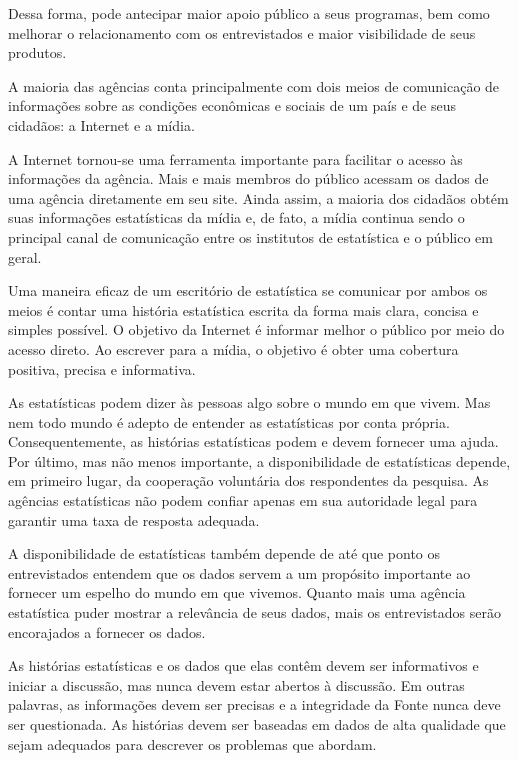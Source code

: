 Dessa forma, pode antecipar maior apoio público a seus programas, bem como melhorar o relacionamento com os entrevistados e maior visibilidade de seus produtos.\vskip0.3cm 

A maioria das agências conta principalmente com dois meios de comunicação de informações sobre as condições econômicas e sociais de um país e de seus cidadãos: a Internet e a mídia.\vskip0.3cm 

A Internet tornou-se uma ferramenta importante para facilitar o acesso às informações da agência. Mais e mais membros do público acessam os dados de uma agência diretamente em seu site. Ainda assim, a maioria dos cidadãos obtém suas informações estatísticas da mídia e, de fato, a mídia continua sendo o principal canal de comunicação entre os institutos de estatística e o público em geral.\vskip0.3cm 


Uma maneira eficaz de um escritório de estatística se comunicar por ambos os meios é contar uma história estatística escrita da forma mais clara, concisa e simples possível. O objetivo da Internet é informar melhor o público por meio do acesso direto. Ao escrever para a mídia, o objetivo é obter uma cobertura positiva, precisa e informativa.\vskip0.3cm 

As estatísticas podem dizer às pessoas algo sobre o mundo em que vivem. Mas nem todo mundo é adepto de entender as estatísticas por conta própria. Consequentemente, as histórias estatísticas podem e devem fornecer uma ajuda.
Por último, mas não menos importante, a disponibilidade de estatísticas depende, em primeiro lugar, da cooperação voluntária dos respondentes da pesquisa. As agências estatísticas não podem confiar apenas em sua autoridade legal para garantir uma taxa de resposta adequada.\vskip0.3cm 


A disponibilidade de estatísticas também depende de até que ponto os entrevistados entendem que os dados servem a um propósito importante ao fornecer um espelho do mundo em que vivemos. Quanto mais uma agência estatística puder mostrar a relevância de seus dados, mais os entrevistados serão encorajados a fornecer os dados.\vskip0.3cm 

 As histórias estatísticas e os dados que elas contêm devem ser informativos e iniciar a discussão, mas nunca devem estar abertos à discussão. Em outras palavras, as informações devem ser precisas e a integridade da Fonte nunca deve ser questionada. As histórias devem ser baseadas em dados de alta qualidade que sejam adequados para descrever os problemas que abordam.\vskip0.3cm 

